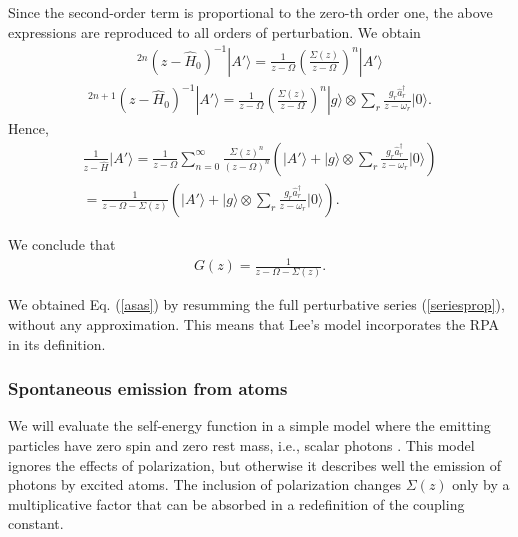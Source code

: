 \documentclass[12pt]{article}
\numberwithin{equation}{section}
\begin{document}
Since the second-order term is proportional to the zero-th order one, the above expressions are reproduced to all orders of perturbation. We obtain
\begin{eqnarray}
[(z - \hat{H}_0)^{-1}\hat{V}]^{2n}(z - \hat{H}_0)^{-1} |A'\rangle = \frac{1}{z- \Omega} \left(\frac{ \Sigma(z)}{z- \Omega}\right)^n|A'\rangle \nonumber
\end{eqnarray}
\begin{eqnarray}
[(z - \hat{H}_0)^{-1}\hat{V}]^{2n+1} (z - \hat{H}_0)^{-1} |A'\rangle = \frac{1}{z- \Omega} \left(\frac{ \Sigma(z)}{z- \Omega}\right)^n|g\rangle \otimes \sum_r \frac{g_r \hat{a}^{\dagger}_r}{z- \omega_r } |0\rangle. \nonumber
\end{eqnarray}
Hence,
\begin{eqnarray}
\frac{1}{z -\hat{H}}|A'\rangle =  \frac{1}{z-\Omega} \sum_{n=0}^{\infty} \frac{\Sigma(z)^n}{(z-\Omega)^n} \left(|A'\rangle + |g\rangle \otimes \sum_r \frac{g_r \hat{a}^{\dagger}_r}{z- \omega_r} |0\rangle\right)\nonumber \\
 = \frac{1}{z - \Omega - \Sigma(z)}\left(|A'\rangle + |g\rangle \otimes \sum_r \frac{g_r \hat{a}^{\dagger}_r}{z- \omega_r} |0\rangle\right). \label{decay555}
\end{eqnarray}

We conclude that
\begin{eqnarray}
G(z)   =  \frac{1}{z - \Omega - \Sigma(z)}. \label {asas2}
\end{eqnarray}

We obtained Eq.  (\ref{asas}) by resumming the full perturbative series (\ref{seriesprop}), without any approximation. This means that
 Lee's model incorporates the RPA in its definition.


\subsubsection{Spontaneous emission from atoms}
We will evaluate the self-energy function in a simple model where the emitting particles have zero spin and zero rest mass, i.e., scalar photons \cite{AnHu}. This model ignores the effects of polarization, but otherwise it describes well the emission of photons by excited atoms. The inclusion of polarization changes $\Sigma(z)$  only by a multiplicative factor that  can be absorbed in a redefinition of the coupling constant.
\end{document}
